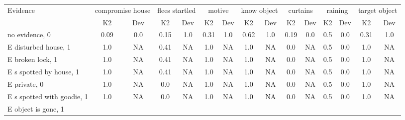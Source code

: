 \begin{table}\begin{tabular}{l|cc|cc|cc|cc|cc|cc|cc}\toprule\multirow{2}{*}{Evidence} & \multicolumn{2}{c}{compromise house}& \multicolumn{2}{c}{flees startled}& \multicolumn{2}{c}{motive}& \multicolumn{2}{c}{know object}& \multicolumn{2}{c}{curtains}& \multicolumn{2}{c}{raining}& \multicolumn{2}{c}{target object}\\& {K2} & {Dev}& {K2} & {Dev}& {K2} & {Dev}& {K2} & {Dev}& {K2} & {Dev}& {K2} & {Dev}& {K2} & {Dev}\\\midrule
no evidence, 0 & \cellcolor{Bittersweet}0.09&\cellcolor{Bittersweet}0.0&\cellcolor{Bittersweet}0.15&\cellcolor{Bittersweet}1.0&\cellcolor{Bittersweet}0.31&\cellcolor{Bittersweet}1.0&\cellcolor{Bittersweet}0.62&\cellcolor{Bittersweet}1.0&\cellcolor{Bittersweet}0.19&\cellcolor{Bittersweet}0.0&\cellcolor{Bittersweet}0.5&\cellcolor{Bittersweet}0.0&\cellcolor{Bittersweet}0.31&\cellcolor{Bittersweet}1.0\\E disturbed house, 1 & \cellcolor{Bittersweet}1.0&\cellcolor{Bittersweet}NA&\cellcolor{Bittersweet}0.41&\cellcolor{Bittersweet}NA&\cellcolor{Bittersweet}1.0&\cellcolor{Bittersweet}NA&\cellcolor{Bittersweet}1.0&\cellcolor{Bittersweet}NA&\cellcolor{Bittersweet}0.0&\cellcolor{Bittersweet}NA&\cellcolor{Bittersweet}0.5&\cellcolor{Bittersweet}0.0&\cellcolor{Bittersweet}1.0&\cellcolor{Bittersweet}NA\\E broken lock, 1 & \cellcolor{Bittersweet}1.0&\cellcolor{Bittersweet}NA&\cellcolor{Bittersweet}0.41&\cellcolor{Bittersweet}NA&\cellcolor{Bittersweet}1.0&\cellcolor{Bittersweet}NA&\cellcolor{Bittersweet}1.0&\cellcolor{Bittersweet}NA&\cellcolor{Bittersweet}0.0&\cellcolor{Bittersweet}NA&\cellcolor{Bittersweet}0.5&\cellcolor{Bittersweet}0.0&\cellcolor{Bittersweet}1.0&\cellcolor{Bittersweet}NA\\E s spotted by house, 1 & \cellcolor{Bittersweet}1.0&\cellcolor{Bittersweet}NA&\cellcolor{Bittersweet}0.41&\cellcolor{Bittersweet}NA&\cellcolor{Bittersweet}1.0&\cellcolor{Bittersweet}NA&\cellcolor{Bittersweet}1.0&\cellcolor{Bittersweet}NA&\cellcolor{Bittersweet}0.0&\cellcolor{Bittersweet}NA&\cellcolor{Bittersweet}0.5&\cellcolor{Bittersweet}0.0&\cellcolor{Bittersweet}1.0&\cellcolor{Bittersweet}NA\\E private, 0 & \cellcolor{Bittersweet}1.0&\cellcolor{Bittersweet}NA&\cellcolor{Bittersweet}0.0&\cellcolor{Bittersweet}NA&\cellcolor{Bittersweet}1.0&\cellcolor{Bittersweet}NA&\cellcolor{Bittersweet}1.0&\cellcolor{Bittersweet}NA&\cellcolor{Bittersweet}0.0&\cellcolor{Bittersweet}NA&\cellcolor{Bittersweet}0.5&\cellcolor{Bittersweet}0.0&\cellcolor{Bittersweet}1.0&\cellcolor{Bittersweet}NA\\E s spotted with goodie, 1 & \cellcolor{Bittersweet}1.0&\cellcolor{Bittersweet}NA&\cellcolor{Bittersweet}0.0&\cellcolor{Bittersweet}NA&\cellcolor{Bittersweet}1.0&\cellcolor{Bittersweet}NA&\cellcolor{Bittersweet}1.0&\cellcolor{Bittersweet}NA&\cellcolor{Bittersweet}0.0&\cellcolor{Bittersweet}NA&\cellcolor{Bittersweet}0.5&\cellcolor{Bittersweet}0.0&\cellcolor{Bittersweet}1.0&\cellcolor{Bittersweet}NA\\E object is gone, 1 & 
\end{tabular}
\end{table}
